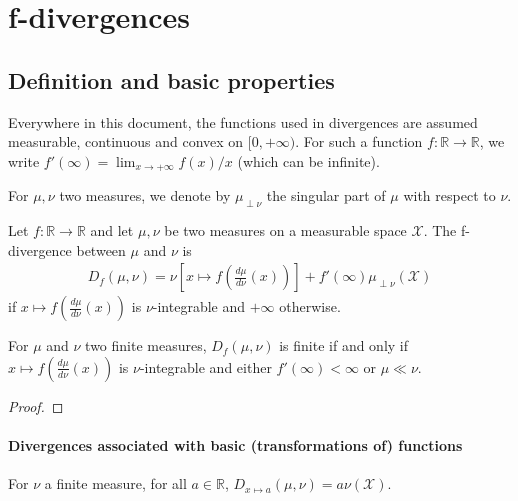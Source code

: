 \section{f-divergences}

\subsection{Definition and basic properties}

Everywhere in this document, the functions used in divergences are assumed measurable, continuous and convex on $[0, +\infty)$.
For such a function $f : \mathbb{R} \to \mathbb{R}$, we write $f'(\infty) = \lim_{x \to +\infty} f(x)/x$ (which can be infinite).

For $\mu, \nu$ two measures, we denote by $\mu_{\perp \nu}$ the singular part of $\mu$ with respect to $\nu$.

\begin{definition}[f-divergence]
  \label{def:fDiv}
  \leanok
  Let $f : \mathbb{R} \to \mathbb{R}$ and let $\mu, \nu$ be two measures on a measurable space $\mathcal X$. The f-divergence between $\mu$ and $\nu$ is
  \begin{align*}
  D_f(\mu, \nu) = \nu\left[x \mapsto f\left(\frac{d \mu}{d \nu}(x)\right)\right] + f'(\infty) \mu_{\perp \nu}(\mathcal X)
  \end{align*}
  if $x \mapsto f\left(\frac{d \mu}{d \nu}(x)\right)$ is $\nu$-integrable and $+\infty$ otherwise.
\end{definition}


\begin{lemma}
  \label{lem:fDiv_ne_top_iff}
  \leanok
  For $\mu$ and $\nu$ two finite measures, $D_f(\mu, \nu)$ is finite if and only if $x \mapsto f\left(\frac{d \mu}{d \nu}(x)\right)$ is $\nu$-integrable and either $f'(\infty) < \infty$ or $\mu \ll \nu$.
\end{lemma}

\begin{proof}\leanok
\end{proof}



\paragraph{Divergences associated with basic (transformations of) functions}

\begin{lemma}
  \label{lem:fDiv_const}
  For $\nu$ a finite measure, for all $a \in \mathbb{R}$, $D_{x \mapsto a}(\mu, \nu) = a \nu(\mathcal X)$.
\end{lemma}

